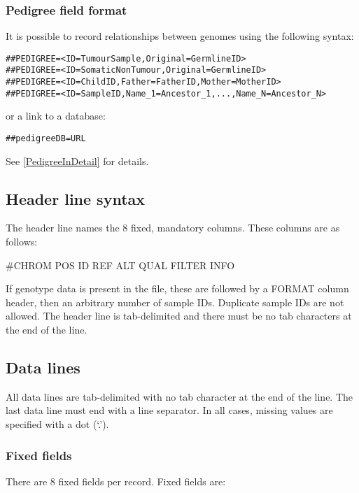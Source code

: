 \documentclass[8pt]{article}
\begin{document}
\subsubsection{Pedigree field format}
It is possible to record relationships between genomes using the following syntax:
\begin{verbatim}
##PEDIGREE=<ID=TumourSample,Original=GermlineID>
##PEDIGREE=<ID=SomaticNonTumour,Original=GermlineID>
##PEDIGREE=<ID=ChildID,Father=FatherID,Mother=MotherID>
##PEDIGREE=<ID=SampleID,Name_1=Ancestor_1,...,Name_N=Ancestor_N>
\end{verbatim}
\noindent or a link to a database:
\begin{verbatim}
##pedigreeDB=URL
\end{verbatim}

\noindent See \ref{PedigreeInDetail} for details.


\subsection{Header line syntax}
The header line names the 8 fixed, mandatory columns. These columns are as follows:
\begin{center}
       \#CHROM
\qquad POS
\qquad ID
\qquad REF
\qquad ALT
\qquad QUAL
\qquad FILTER
\qquad INFO
\end{center}
\noindent
If genotype data is present in the file, these are followed by a FORMAT column header, then an arbitrary number of sample IDs.
Duplicate sample IDs are not allowed.
The header line is tab-delimited and there must be no tab characters at the end of the line.

\subsection{Data lines}
\label{data-lines}
All data lines are tab-delimited with no tab character at the end of the line.
The last data line must end with a line separator.
In all cases, missing values are specified with a dot (`.').

\subsubsection{Fixed fields}
There are 8 fixed fields per record.
Fixed fields are:
\end{document}
